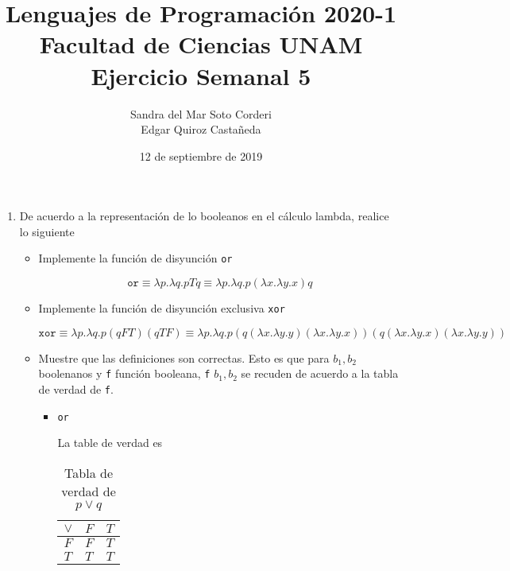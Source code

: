 \documentclass{article}
\title{
    Lenguajes de Programación 2020-1 \\
    Facultad de Ciencias UNAM \\
    Ejercicio Semanal 5
}
\author{
    Sandra del Mar Soto Corderi \\
    Edgar Quiroz Castañeda
}
\date{
    12 de septiembre de 2019
}
\begin{document}
    \maketitle
    \begin{enumerate}
        \item {
            De acuerdo a la representación de lo booleanos en el cálculo lambda,
            realice lo siguiente
            \begin{itemize}
                \item {
                    Implemente la función de disyunción \texttt{or}

                    \[
                        \texttt{or} \equiv 
                        \lambda p. \lambda q. p T q
                        \equiv \lambda p. \lambda q. p (\lambda x. \lambda y. x) q 
                    \]
                }
                \item {
                    Implemente la función de disyunción exclusiva \texttt{xor}

                    \[
                        \texttt{xor} \equiv 
                        \lambda p. \lambda q. p (q F T) (q T F)
                        \equiv \lambda p. \lambda q. p 
                        (q (\lambda x. \lambda y. y) (\lambda x. \lambda y. x)) 
                        (q (\lambda x. \lambda y. x) (\lambda x. \lambda y. y))
                    \]
                }
                \item {
                    Muestre que las definiciones son correctas. Esto es que para
                    $b_1, b_2$ boolenanos y \texttt{f} función booleana,
                    \texttt{f} $b_1, b_2$ se recuden de acuerdo a la tabla de
                    verdad de \texttt{f}.
                    \begin{itemize}
                        \item {
                            \texttt{or}

                            La table de verdad es 

                            \begin{table}[H]
                                \centering
                                \begin{tabular}{|l|l|l|}
                                    \hline
                                    $\lor$ & $F$ & $T$ \\ \hline
                                    $F$    & $F$ & $T$ \\ \hline
                                    $T$    & $T$ & $T$ \\ \hline
                                \end{tabular}
                                \caption{Tabla de verdad de $p \lor q$}
                                \label{tab:truth_or}
                            \end{table}

}
\end{itemize}}
\end{itemize}}
\end{enumerate}
\end{document}
